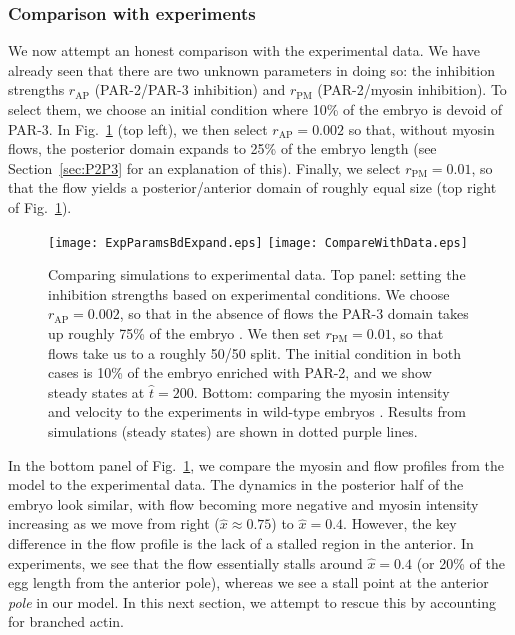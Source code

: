 \documentclass[11pt]{article}
\newcommand{\6}[1]{#1_{\text{6}}}
\newcommand{\3}[1]{#1_{\text{3}}}
\begin{document}
\subsubsection{Comparison with experiments}
We now attempt an honest comparison with the experimental data. We have already seen that there are two unknown parameters in doing so: the inhibition strengths $r_\text{AP}$ (PAR-2/PAR-3 inhibition) and $r_\text{PM}$ (PAR-2/myosin inhibition). To select them, we choose an initial condition where 10\% of the embryo is devoid of PAR-3. In Fig.\ \ref{fig:BestCompP2P3My} (top left), we then select $r_\text{AP}=0.002$ so that, without myosin flows, the posterior domain expands to 25\% of the embryo length \cite[Fig.~5B]{zonies2010symmetry} (see Section\ \ref{sec:P2P3} for an explanation of this). Finally, we select $r_\text{PM}=0.01$, so that the flow yields a posterior/anterior domain of roughly equal size (top right of Fig.\ \ref{fig:BestCompP2P3My}). 

\begin{figure}
\centering
\texttt{[image: ExpParamsBdExpand.eps]}
\texttt{[image: CompareWithData.eps]}
\caption{\label{fig:BestCompP2P3My} Comparing simulations to experimental data. Top panel: setting the inhibition strengths based on experimental conditions. We choose $r_\text{AP}=0.002$, so that in the absence of flows the PAR-3 domain takes up roughly 75\% of the embryo \cite[Fig.~5B]{zonies2010symmetry}. We then set $r_\text{PM}=0.01$, so that flows take us to a roughly 50/50 split. The initial condition in both cases is 10\% of the embryo enriched with PAR-2, and we show steady states at $\hat t = 200$. Bottom: comparing the myosin intensity and velocity to the experiments in wild-type embryos \cite{sailer2015dynamic}. Results from simulations (steady states) are shown in dotted purple lines.}
\end{figure}

In the bottom panel of Fig.\ \ref{fig:BestCompP2P3My}, we compare the myosin and flow profiles from the model to the experimental data. The dynamics in the posterior half of the embryo look similar, with flow becoming more negative and myosin intensity increasing as we move from right ($\hat x \approx 0.75$) to $\hat x = 0.4$. However, the key difference in the flow profile is the lack of a stalled region in the anterior. In experiments, we see that the flow essentially stalls around $\hat x = 0.4$ (or 20\% of the egg length from the anterior pole), whereas we see a stall point at the anterior \emph{pole} in our model. In this next section, we attempt to rescue this by accounting for branched actin.
\end{document}
